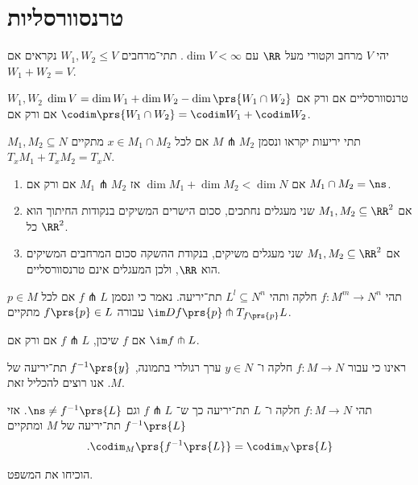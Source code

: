 \documentclass[a4paper,10pt,twoside,openany]{book}
\begin{document}
\section{טרנסוורסליות}
\begin{definition}
יהי
$V$
מרחב וקטורי מעל
$\RR$
עם
$\dim V < \infty$.
תתי־מרחבים
$W_1,W_2 \leq V$
נקראים
אם
$W_1 + W_2 = V$.
\end{definition}
\begin{remark}
$W_1,W_2$
טרנסוורסליים אם ורק אם
$\dim V = \dim W_1 + \dim W_2 - \dim\prs{W_1 \cap W_2}$
אם ורק אם
$\codim\prs{W_1 \cap W_2} = \codim W_1 + \codim W_2$.
\end{remark}
\begin{definition}
$M_1, M_2 \subseteq N$
תתי יריעות יקראו
ונסמן
$M \pitchfork M_2$
אם לכל
$x \in M_1 \cap M_2$
מתקיים
$T_x M_1 + T_x M_2 = T_x N$.
\end{definition}
\begin{examples}
\begin{enumerate}
\item
אם
$\dim M_1 + \dim M_2 < \dim N$
אז
$M_1 \pitchfork M_2$
אם ורק אם
$M_1 \cap M_2 = \ns$.
\item
אם
$M_1, M_2 \subseteq \RR^2$
שני מעגלים נחתכים, סכום הישרים המשיקים בנקודות החיתוך הוא כל
$\RR^2$.
\item
אם
$M_1, M_2 \subseteq \RR^2$
שני מעגלים משיקים, בנקודת ההשקה סכום המרחבים המשיקים הוא
$\RR$,
ולכן המעגלים אינם טרנסוורסליים.
\end{enumerate}
\end{examples}
\begin{definition}
תהי
$f \colon M^m \to N^n$
חלקה ותהי
$L^l \subseteq N^n$
תת־יריעה.
נאמר כי
ונסמן
$f \pitchfork L$
אם לכל
$p \in M$
עבורה
$f\prs{p} \in L$
מתקיים
$\im Df\prs{p} \pitchfork T_{f\prs{p}}L$.
\end{definition}
\begin{remark}
אם
$f$
שיכון,
$f \pitchfork L$
אם ורק אם
$\im f \pitchfork L$.
\end{remark}

ראינו כי עבור
$f \colon M \to N$
חלקה ו־%
$y \in N$
ערך רגולרי בתמונה,
$f^{-1}\prs{y}$
תת־יריעה של
$M$.
אנו רוצים להכליל זאת.

\begin{theorem}
תהי
$f \colon M \to N$
חלקה ו־%
$L$
תת־יריעה כך ש־%
$f \pitchfork L$
וגם
$\ns \neq f^{-1}\prs{L}$.
אזי
$f^{-1}\prs{L}$
תת־יריעה של
$M$
ומתקיים
\[\text{.}\codim_{M}\prs{f^{-1}\prs{L}} = \codim_N\prs{L}\]
\end{theorem}
\begin{exercise}
הוכיחו את המשפט.
\end{exercise}
\end{document}
